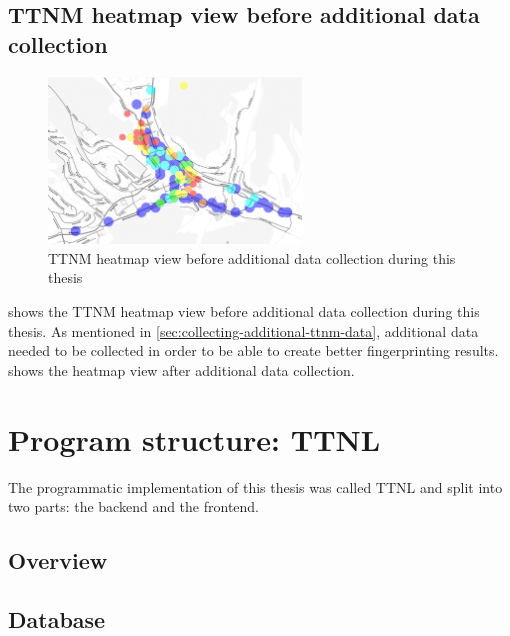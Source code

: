 \subsection{\acl{TTNM} heatmap view before additional data collection}

\begin{figure}
    \centering
    \includegraphics[width=0.6\textwidth]{pictures/ttn-mapper/ttnmapper_heatmap_before.png}
    \caption{\ac{TTNM} heatmap view before additional data collection during this thesis\label{pic:ttnm-before-data-collection}}
\end{figure}

 shows the \ac{TTNM} heatmap view before additional data collection during this thesis.
As mentioned in \cref{sec:collecting-additional-ttnm-data}, additional data needed to be collected in order to be able to create better fingerprinting results.
 shows the heatmap view after additional data collection.

\section{Program structure: \acf{TTNL}}\label{section:ttnl}

The programmatic implementation of this thesis was called \acf{TTNL} and split into two parts: the backend and the frontend.

\subsection{Overview}



\subsection{Database}

